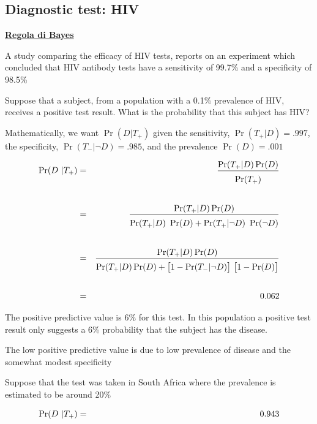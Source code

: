 \documentclass[11pt,openany]{book}
\begin{document}
\clearpage\subsection{Diagnostic test: HIV}
\hfill\textbf{{\color{brown}\hyperref[RegolaBayes]{Regola di Bayes} \faShare}}
\label{HIV_test}

A study comparing the efficacy of HIV tests, reports on an
experiment which concluded that HIV antibody tests have a
{\color{violet}sensitivity of 99.7\%} and a {\color{violet}specificity of 98.5\%}

Suppose that a subject, from a population with a {\color{violet} 0.1\% prevalence}
of HIV, receives a positive test result. What is the probability
that this subject has HIV?

Mathematically, we want $\Pr(D | T_+)$ given the sensitivity, {\color{violet}$\Pr(T_+
| D) = .997$}, the specificity, {\color{violet}$\Pr(T_- | \neg D) =.985$}, and the
prevalence {\color{violet}$\Pr(D) = .001$}

\begin{eqnarray*}
\Pr(D ~|T_+)& = &\frac{\Pr(T_+|D)\Pr(D)}{\Pr(T_+)\vphantom{\Big[}}\\ \\
& = &\frac{\Pr(T_+|D)\Pr(D)}{\Pr(T_+|D)\ \Pr(D) + \Pr(T_+|\neg D)\ \Pr(\neg D)\vphantom{\Big[}}\\ \\
& = & \frac{\Pr(T_+|D)\Pr(D)}{\Pr(T_+|D)\Pr(D) + \big[1-\Pr(T_-|\neg D)\big]\ \big[1 - \Pr(D)\big]\vphantom{\Big[}} \\ \\
& = & 0.062
\end{eqnarray*}

The {\color{violet}positive predictive value is 6\%} for this test. In this population a positive test result only suggests a 6\% probability that the subject has the disease. 


The low positive predictive value is due to low prevalence of disease and the
somewhat modest specificity 

Suppose that the test was taken in South Africa where the prevalence is estimated to be around 20\%

\begin{eqnarray*}
\Pr(D ~|T_+)& = & 0.943\\
& \hphantom{=} & \hphantom{\frac{\Pr(T_+|D)\Pr(D)}{\Pr(T_+|D)\Pr(D) + \big[1-\Pr(T_-|\neg D)\big]\ \big[1 - \Pr(D)\big]\vphantom{\Big[}}}
\end{eqnarray*}
\end{document}
